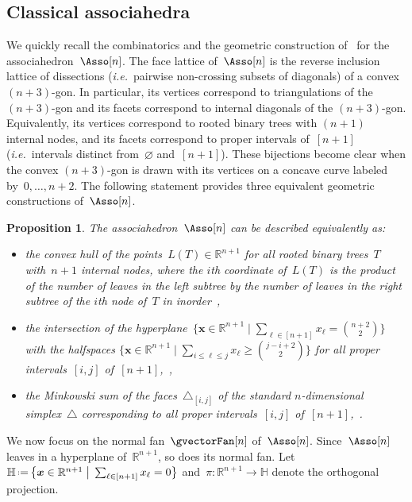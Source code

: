 \documentclass{amsart}
\newtheorem{proposition}[theorem]{Proposition}
\theoremstyle{definition}
\newcommand{\R}{\mathbb{R}} %
\newcommand{\HH}{\mathbb{H}} %
\renewcommand{\b}[1]{{\boldsymbol{#1}}} %
\newcommand{\bigset}[2]{\big\{ #1 \;\big|\; #2 \big\}} %
\newcommand{\eqdef}{\mbox{\,\raisebox{0.2ex}{\scriptsize\ensuremath{\mathrm:}}\ensuremath{=}\,}} %
\newcommand{\simplex}{\triangle} %
\newcommand{\ie}{\textit{i.e.}~} %
\begin{document}

\subsection{Classical associahedra}

We quickly recall the combinatorics and the geometric construction of~\cite{ShniderSternberg, Loday} for the associahedron~$\Asso[n]$.
The face lattice of~$\Asso[n]$ is the reverse inclusion lattice of dissections (\ie pairwise non-crossing subsets of diagonals) of a convex~$(n+3)$-gon.
In particular, its vertices correspond to triangulations of the $(n+3)$-gon and its facets correspond to internal diagonals of the $(n+3)$-gon.
Equivalently, its vertices correspond to rooted binary trees with $(n+1)$ internal nodes, and its facets correspond to proper intervals of~$[n+1]$ (\ie intervals distinct from~$\varnothing$ and~$[n+1]$).
These bijections become clear when the convex $(n+3)$-gon is drawn with its vertices on a concave curve labeled by~$0, \dots, n+2$.
The following statement provides three equivalent geometric constructions of~$\Asso[n]$.

\begin{proposition}
The associahedron~$\Asso[n]$ can be described equivalently as:
\begin{itemize}
\item the convex hull of the points~$L(T) \in \R^{n+1}$ for all rooted binary trees~$T$ with~$n+1$ internal nodes, where the $i$th coordinate of~$L(T)$ is the product of the number of leaves in the left subtree by the number of leaves in the right subtree of the $i$th node of~$T$ in inorder~\cite{Loday},
\item the intersection of the hyperplane~$\bigset{\b{x} \in \R^{n+1}}{\sum_{\ell \in [n+1]} x_\ell = \binom{n+2}{2}}$ with the halfspaces $\bigset{\b{x} \in \R^{n+1}}{\sum_{i \le \ell \le j} x_\ell \ge \binom{j-i+2}{2}}$ for all proper intervals~$[i,j]$ of~$[n+1]$,~\cite{ShniderSternberg},
\item the Minkowski sum of the faces~$\simplex_{[i,j]}$ of the standard $n$-dimensional simplex~$\simplex$ corresponding to all proper intervals~$[i,j]$ of~$[n+1]$,~\cite{Postnikov}.
\end{itemize}
\end{proposition}

We now focus on the normal fan~$\gvectorFan[n]$ of~$\Asso[n]$.
Since~$\Asso[n]$ leaves in a hyperplane of~$\R^{n+1}$, so does its normal fan.
Let~$\HH \eqdef \bigset{\b{x} \in \R^{n+1}}{\sum_{\ell \in [n+1]} x_\ell = 0}$ and~$\pi : \R^{n+1} \to \HH$ denote the orthogonal projection.
\end{document}
